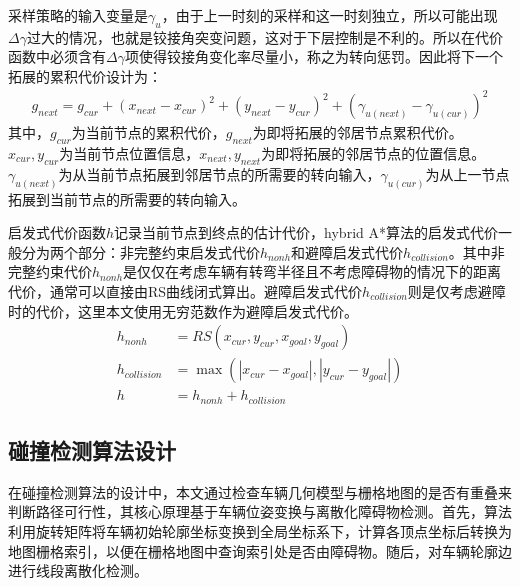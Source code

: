\documentclass[master,academic]{ysuthesis} %
\begin{document}
		采样策略的输入变量是$\gamma_u$，由于上一时刻的采样和这一时刻独立，所以可能出现$\Delta {\gamma}$过大的情况，也就是铰接角突变问题，这对于下层控制是不利的。所以在代价函数中必须含有$\Delta {\gamma}$项使得铰接角变化率尽量小，称之为转向惩罚。因此将下一个拓展的累积代价设计为：
		\begin{equation}
			\begin{aligned}
				g_{next}=g_{cur}+ (x_{next}-x_{cur} ) ^2+ (y_{next}-y_{cur} ) ^2+ (\gamma _{u(next)}-\gamma _{u (cur)} ) ^2
			\end{aligned}
		\end{equation}
		其中，$g_{cur}$为当前节点的累积代价，$g_{next}$为即将拓展的邻居节点累积代价。$x_{cur},y_{cur}$为当前节点位置信息，$x_{next},y_{next}$为即将拓展的邻居节点的位置信息。$\gamma _{u(next)}$为从当前节点拓展到邻居节点的所需要的转向输入，$\gamma _{u(cur)}$为从上一节点拓展到当前节点的所需要的转向输入。

		启发式代价函数$h$记录当前节点到终点的估计代价，hybrid A*算法的启发式代价一般分为两个部分：非完整约束启发式代价$h_{nonh}$和避障启发式代价$h_{collision}$。其中非完整约束代价$h_{nonh}$是仅仅在考虑车辆有转弯半径且不考虑障碍物的情况下的距离代价，通常可以直接由RS曲线闭式算出。避障启发式代价$h_{collision}$则是仅考虑避障时的代价，这里本文使用无穷范数作为避障启发式代价。
		\begin{equation}
			\begin{aligned}
				h_{nonh} &= RS(x_{cur},y_{cur},x_{goal},y_{goal})\\
				h_{collision} &= \max( |x_{cur}-x_{goal}|,|y_{cur}-y_{goal}|)\\
				h &= h_{nonh}+h_{collision}
			\end{aligned}
		\end{equation}

		\subsection{碰撞检测算法设计}
		在碰撞检测算法的设计中，本文通过检查车辆几何模型与栅格地图的是否有重叠来判断路径可行性，其核心原理基于车辆位姿变换与离散化障碍物检测。首先，算法利用旋转矩阵将车辆初始轮廓坐标变换到全局坐标系下，计算各顶点坐标后转换为地图栅格索引，以便在栅格地图中查询索引处是否由障碍物。随后，对车辆轮廓边进行线段离散化检测。
		
\end{document}
